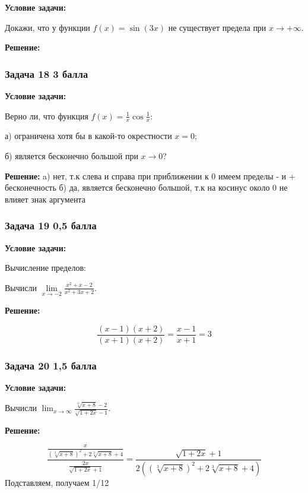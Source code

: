 \documentclass[a4paper,12pt]{article}
\begin{document}
\textbf{Условие задачи:}

Докажи, что у функции $f(x) = \sin(3x)$ не существует предела при $x \to +\infty$.

\textbf{Решение: }

\vspace{1cm}

\subsubsection{Задача 18 \hfill 3 балла}

\textbf{Условие задачи:}

Верно ли, что функция $f(x) = \frac{1}{x} \cos \frac{1}{x}$:

а) ограничена хотя бы в какой-то окрестности $x = 0$;

б) является бесконечно большой при $x \to 0$?

\textbf{Решение: }
a) нет, т.к слева и справа при приближении к 0 имеем пределы - и + бесконечность 
б) да, является бесконечно большой, т.к на косинус около 0 не влияет знак аргумента
\vspace{1cm}

\subsubsection{Задача 19 \hfill 0,5 балла}

\textbf{Условие задачи:}

Вычисление пределов:

Вычисли $\lim\limits_{x \to -2} \frac{x^2 + x - 2}{x^2 + 3x + 2}$.

\textbf{Решение: }

\[
\frac{(x-1)(x+2)}{(x+1)(x+2)}=\frac{x-1}{x+1}=3
\]

\vspace{1cm}

\subsubsection{Задача 20 \hfill 1,5 балла}

\textbf{Условие задачи:}

Вычисли $\lim_{x \to \infty} \frac{\sqrt[3]{x+8}-2}{\sqrt{1+2x}-1}$.

\textbf{Решение: }

\[
\frac{\frac{x}{(\sqrt[3]{x+8})^2+2\sqrt[3]{x+8}+4}}{\frac{2x}{\sqrt{1+2x}+1}}=\frac{\sqrt{1+2x}+1}{2((\sqrt[3]{x+8})^2 + 2\sqrt[3]{x+8} + 4)}
\]
Подставляем, получаем 1/12
\vspace{1cm}
\end{document}
